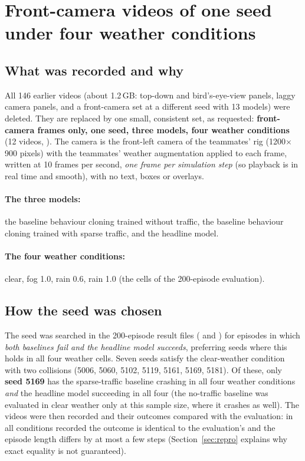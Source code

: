 \section{Front-camera videos of one seed under four weather conditions}\label{sec:videos}

\subsection{What was recorded and why}
All 146 earlier videos (about 1.2\,GB: top-down and bird's-eye-view panels, laggy camera panels, and a front-camera set at a different seed with 13 models) were deleted. They are replaced by one small, consistent set, as requested: \textbf{front-camera frames only, one seed, three models, four weather conditions} (12 videos, ).
The camera is the front-left camera of the teammates' rig (1200$\times$900 pixels) with the teammates' weather augmentation applied to each frame, written at 10 frames per second, \emph{one frame per simulation step} (so playback is in real time and smooth), with no text, boxes or overlays.

\paragraph{The three models:} the baseline behaviour cloning trained without traffic, the baseline behaviour cloning trained with sparse traffic, and the headline model.
\paragraph{The four weather conditions:} clear, fog 1.0, rain 0.6, rain 1.0 (the cells of the 200-episode evaluation).

\subsection{How the seed was chosen}
The seed was searched in the 200-episode result files ( and ) for episodes in which \emph{both baselines fail and the headline model succeeds}, preferring seeds where this holds in all four weather cells.
Seven seeds satisfy the clear-weather condition with two collisions (5006, 5060, 5102, 5119, 5161, 5169, 5181). Of these, only \textbf{seed 5169} has the sparse-traffic baseline crashing in all four weather conditions \emph{and} the headline model succeeding in all four (the no-traffic baseline was evaluated in clear weather only at this sample size, where it crashes as well).
The videos were then recorded and their outcomes compared with the evaluation: in all conditions recorded the outcome is identical to the evaluation's and the episode length differs by at most a few steps (Section~\ref{sec:repro} explains why exact equality is not guaranteed).

